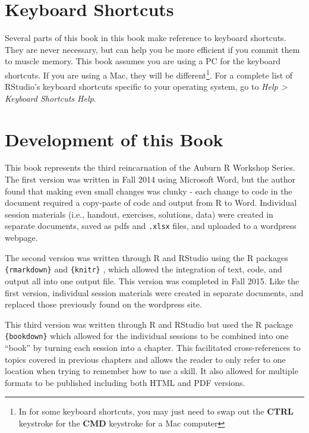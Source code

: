 \documentclass[]{book}
\let\rmarkdownfootnote\footnote%
\def\footnote{\protect\rmarkdownfootnote}
\theoremstyle{definition}
\theoremstyle{definition}
\theoremstyle{definition}
\theoremstyle{remark}
\begin{document}
\section*{Keyboard Shortcuts}\label{keyboard-shortcuts}

Several parts of this book in this book make reference to keyboard
shortcuts. They are never necessary, but can help you be more efficient
if you commit them to muscle memory. This book assumes you are using a
PC for the keyboard shortcuts. If you are using a Mac, they will be
different\footnote{In for some keyboard shortcuts, you may just need to
  swap out the \textbf{CTRL} keystroke for the \textbf{CMD} keystroke
  for a Mac computer}. For a complete list of RStudio's keyboard
shortcuts specific to your operating system, go to \emph{Help
\textgreater{} Keyboard Shortcuts Help}.

\section*{Development of this Book}\label{development-of-this-book}

This book represents the third reincarnation of the Auburn R Workshop
Series. The first version was written in Fall 2014 using Microsoft Word,
but the author found that making even small changes was clunky - each
change to code in the document required a copy-paste of code and output
from R to Word. Individual session materials (i.e., handout, exercises,
solutions, data) were created in separate documents, saved as pdfs and
\texttt{.xlsx} files, and uploaded to a wordpress webpage.

The second version was written through R and RStudio using the R
packages \texttt{\{rmarkdown\}} \citep{rmarkdown-cite} and
\texttt{\{knitr\}} \citep{knitr-cite}, which allowed the integration of
text, code, and output all into one output file. This version was
completed in Fall 2015. Like the first version, individual session
materials were created in separate documents, and replaced those
previously found on the wordpress site.

This third version was written through R and RStudio but used the R
package \texttt{\{bookdown\}} \citep{bookdown-cite} which allowed for
the individual sessions to be combined into one ``book'' by turning each
session into a chapter. This facilitated cross-references to topics
covered in previous chapters and allows the reader to only refer to one
location when trying to remember how to use a skill. It also allowed for
multiple formats to be published including both HTML and PDF versions.
\end{document}
